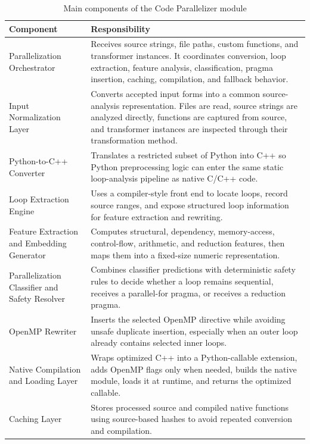 \begin{table}[H]
\centering
\small
\renewcommand{\arraystretch}{1.15}
\setlength{\tabcolsep}{4pt}
\caption{Main components of the Code Parallelizer module}
\begin{tabular}{p{}p{}}
\toprule
Component & Responsibility \\
\midrule
Parallelization Orchestrator & Receives source strings, file paths, custom functions, and transformer instances. It coordinates conversion, loop extraction, feature analysis, classification, pragma insertion, caching, compilation, and fallback behavior. \\
\midrule
Input Normalization Layer & Converts accepted input forms into a common source-analysis representation. Files are read, source strings are analyzed directly, functions are captured from source, and transformer instances are inspected through their transformation method. \\
\midrule
Python-to-C++ Converter & Translates a restricted subset of Python into C++ so Python preprocessing logic can enter the same static loop-analysis pipeline as native C/C++ code. \\
\midrule
Loop Extraction Engine & Uses a compiler-style front end to locate loops, record source ranges, and expose structured loop information for feature extraction and rewriting. \\
\midrule
Feature Extraction and Embedding Generator & Computes structural, dependency, memory-access, control-flow, arithmetic, and reduction features, then maps them into a fixed-size numeric representation. \\
\midrule
Parallelization Classifier and Safety Resolver & Combines classifier predictions with deterministic safety rules to decide whether a loop remains sequential, receives a parallel-for pragma, or receives a reduction pragma. \\
\midrule
OpenMP Rewriter & Inserts the selected OpenMP directive while avoiding unsafe duplicate insertion, especially when an outer loop already contains selected inner loops. \\
\midrule
Native Compilation and Loading Layer & Wraps optimized C++ into a Python-callable extension, adds OpenMP flags only when needed, builds the native module, loads it at runtime, and returns the optimized callable. \\
\midrule
Caching Layer & Stores processed source and compiled native functions using source-based hashes to avoid repeated conversion and compilation. \\
\bottomrule
\end{tabular}
\end{table}

